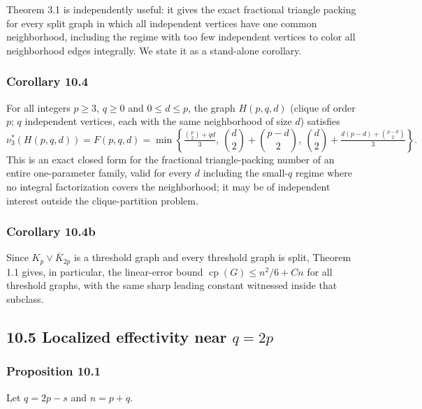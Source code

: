 \documentclass[
  11pt,
]{article}
\begin{document}
Theorem 3.1 is independently useful: it gives the exact fractional
triangle packing for every split graph in which all independent vertices
have one common neighborhood, including the regime with too few
independent vertices to color all neighborhood edges integrally. We
state it as a stand-alone corollary.

\subsubsection{Corollary 10.4}\label{corollary-10.4-exact-common-neighborhood-triangle-packing}

For all integers \(p\ge3\), \(q\ge0\) and \(0\le d\le p\), the graph
\(H(p,q,d)\) (clique of order \(p\); \(q\) independent vertices, each
with the same neighborhood of size \(d\)) satisfies \[
\nu_3^*(H(p,q,d))=F(p,q,d)=\min\left\{\tfrac{\binom p2+qd}{3},\ \binom d2+\binom{p-d}2,\ \binom d2+\tfrac{d(p-d)+\binom{p-d}2}{3}\right\}.
\] This is an exact closed form for the fractional triangle-packing
number of an entire one-parameter family, valid for every \(d\)
including the small-\(q\) regime where no integral factorization covers
the neighborhood; it may be of independent interest outside the
clique-partition problem.

\subsubsection{Corollary 10.4b}\label{corollary-10.4b-threshold-graphs}

Since \(K_p\vee\overline K_{2p}\) is a threshold graph and every
threshold graph is split, Theorem 1.1 gives, in particular, the
linear-error bound \(\operatorname{cp}(G)\le n^2/6+Cn\) for all
threshold graphs, with the same sharp leading constant witnessed inside
that subclass.

\subsection{\texorpdfstring{10.5 Localized effectivity near
\(q=2p\)}{10.5 Localized effectivity near q=2p}}\label{localized-effectivity-near-q2p}

\subsubsection{Proposition 10.1}\label{proposition-10.1-explicit-corridor-bounds}

Let \(q=2p-s\) and \(n=p+q\).
\end{document}
